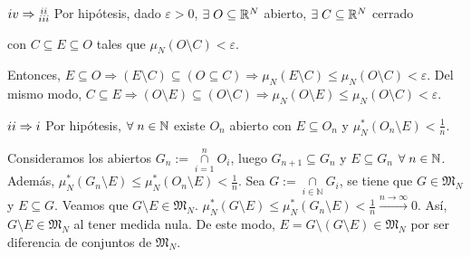 \documentclass[12pt,a4paper]{article}
\newcommand{\R}{\mathbb{R}}
\newcommand{\N}{\mathbb{N}}
\newcommand{\smallcap}{\mathop{\cap}\limits}
\begin{document}
\vspace{6mm}
\begin{tcolorbox}
   \hspace{-3mm} $\romannumeral 4 \Rightarrow \substack{\romannumeral 2\\\romannumeral 3}$ \hspace{3mm} Por hipótesis, dado $\varepsilon > 0$, $\exists \hspace{1mm} O \subseteq \R^N$ abierto, $\exists \hspace{1mm} C \subseteq \R^N$ cerrado 
\end{tcolorbox}
\hspace{-3mm} con $C \subseteq E \subseteq O$ tales que $\mu_N(O \setminus C) < \varepsilon$.

\vspace{2mm}
Entonces, $E \subseteq O \Rightarrow (E \setminus C) \subseteq (O \subseteq C) \Rightarrow \mu_N(E \setminus C) \leq \mu_N(O \setminus C) < \varepsilon$.
\newline Del mismo modo, $C \subseteq E \Rightarrow (O \setminus E) \subseteq (O \setminus C) \Rightarrow \mu_N(O \setminus E) \leq \mu_N(O \setminus C) < \varepsilon$.

\vspace{6mm}
\begin{tcolorbox}
    \hspace{-2mm} $\romannumeral 2 \Rightarrow \romannumeral 1$ \hspace{1mm} Por hipótesis, $\forall \hspace{1mm} n \in \N$ existe $O_n$ abierto con $E \subseteq O_n$ y $\mu^*_N(O_n \setminus E) < \frac{1}{n}$.
\end{tcolorbox}
Consideramos los abiertos $G_n := \smallcap_{i=1}^n O_i$, luego $G_{n+1} \subseteq G_n$ y $E \subseteq G_n$ $\forall \hspace{1mm} n \in \N$.
\vspace{1mm} \newline Además, $\mu^*_N(G_n \setminus E) \leq \mu^*_N(O_n \setminus E) < \frac{1}{n}$.
\vspace{1mm} \newline Sea $G := \smallcap_{i\in\N} G_i$, se tiene que $G \in \mathfrak{M}_N$ y $E \subseteq G$. Veamos que $G \setminus E \in \mathfrak{M}_N$.
\vspace{1mm} \newline $\mu^*_N(G \setminus E) \leq \mu^*_N(G_n \setminus E) < \frac{1}{n} \xrightarrow{n \to \infty} 0$. Así, $G \setminus E \in \mathfrak{M}_N$ al tener medida nula.
\vspace{1mm} \newline De este modo, $E = G \setminus (G \setminus E) \in \mathfrak{M}_N$ por ser diferencia de conjuntos de $\mathfrak{M}_N$.
\end{document}

